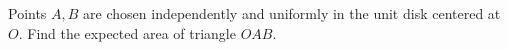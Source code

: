 Points $A,B$ are chosen independently and uniformly in the unit disk centered at $O$. Find the expected area of triangle $OAB$.
